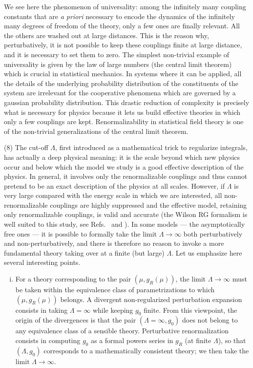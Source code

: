 \documentclass[floatfix,preprintnumbers,amsmath,amssymb,prb,12pt]{revtex4-1}
\begin{document}
{{We see here the phenomenon of universality: among
the infinitely many coupling constants that are {\it a priori}
necessary to encode the dynamics of the infinitely many degrees of
freedom of the theory, only a few ones are finally
relevant.\cite{bagnuls01} All the others are washed out at large
distances. This is the reason why, perturbatively, it is not
possible to keep these couplings finite at large distance, and
it is necessary to set them to zero.\cite{foot12} The simplest
non-trivial example of universality is given by the law of large
numbers (the central limit theorem) which is crucial
in statistical mechanics.\cite{raposo91} In systems where it can
be applied, all the details of the underlying probability
distribution of the constituents of the system are irrelevant for
the cooperative phenomena which are governed by a gaussian
probability distribution.\cite{jona-lasinio00} This drastic
reduction of complexity is precisely what is necessary for physics
because it lets us build effective theories in which only a
few couplings are kept.\cite{lepage89} Renormalizability in
statistical field theory is one of the non-trivial generalizations
of the central limit theorem.

(8) The cut-off $\Lambda$, first introduced as a mathematical
trick to regularize integrals, has actually a deep physical
meaning: it is the scale beyond which new physics occur and below
which the model we study is a good effective description of
the physics. In general, it involves only the renormalizable
couplings and thus cannot pretend to be an exact description of
the physics at all scales. However, if $\Lambda$ is very large
compared with the energy scale in which we are interested, all
non-renormalizable couplings are highly suppressed and the
effective model, retaining only renormalizable couplings, is valid
and accurate (the Wilson RG formalism is well suited to this
study, see Refs.~ and
). In some models --- the asymptotically
free ones --- it is possible to formally take the limit $\Lambda\to\infty$
both perturbatively and non-perturbatively, and there is therefore
no reason to invoke a more fundamental theory taking over at a
finite (but large) $\Lambda$. Let
us emphasize here several interesting points.

\begin{enumerate}[(i)]

\item For a theory corresponding to the pair
$(\mu,g_R(\mu))$, the limit $\Lambda\to\infty$ must be taken
within the equivalence class of parametrizations to which 
$(\mu,g_R(\mu))$
belongs.\cite{nonperb} A
divergent non-regularized perturbation expansion consists in
taking $\Lambda=\infty$ while keeping $g_0$ finite. From this
viewpoint, the origin of the divergences is that the pair
$(\Lambda=\infty,g_0)$ does not belong to any equivalence class of
a sensible theory. Perturbative renormalization consists in
computing $g_0$ as a formal powers series in $g_R$ (at finite
$\Lambda$), so that $(\Lambda,g_0)$ corresponds to a mathematically
consistent theory; we then take the limit $\Lambda\to\infty$.


\end{enumerate}}}
\end{document}
